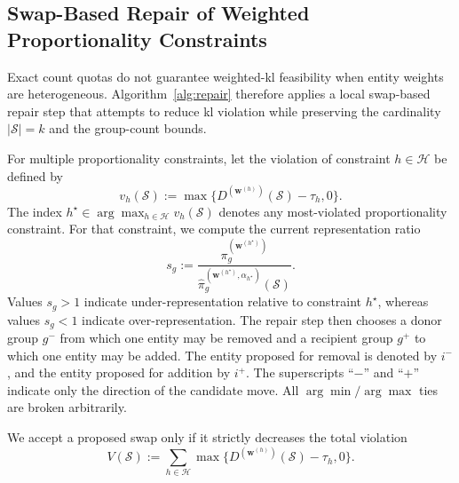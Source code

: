 \documentclass[10pt,journal]{IEEEtran}
\newcommand{\1}{\mathbf{1}}
\newcommand{\bw}{\mathbf{w}}
\newcommand{\Sel}{\mathcal{S}}
\theoremstyle{ieeethm}
\begin{document}
\subsection{Swap-Based Repair of Weighted Proportionality Constraints}
\label{subsec:algo_repair}

Exact count quotas do not guarantee weighted-\gls{kl} feasibility when entity weights are heterogeneous. Algorithm~\ref{alg:repair} therefore applies a local swap-based repair step that attempts to reduce \gls{kl} violation while preserving the cardinality $|\Sel|=k$ and the group-count bounds.

For multiple proportionality constraints, let the violation of constraint $h\in\mathcal H$ be defined by 
\begin{equation*}
 v_h(\Sel):=\max\big\{D^{(\bw^{(h)})}(\Sel)-\tau_h,0\big\}.
\end{equation*}
The index $h^\star\in\arg\max_{h\in\mathcal H} v_h(\Sel)$ denotes any most-violated proportionality constraint. For that constraint, we compute the current representation ratio
\begin{equation*}
s_g
:=
\frac{\pi_g^{(\bw^{(h^\star)})}}
{\widehat{\pi}_g^{(\bw^{(h^\star)},\alpha_{h^\star})}(\Sel)}.
\end{equation*}
Values $s_g>1$ indicate under-representation relative to constraint $h^\star$, whereas values $s_g<1$ indicate over-representation. The repair step then chooses a donor group $g^{-}$ from which one entity may be removed and a recipient group $g^{+}$ to which one entity may be added. The entity proposed for removal is denoted by $i^{-}$, and the entity proposed for addition by $i^{+}$. The superscripts “$-$” and “$+$” indicate only the direction of the candidate move. All $\arg\min/\arg\max$ ties are broken arbitrarily.

We accept a proposed swap only if it strictly decreases the total violation
\[
V(\Sel)
:=
\sum_{h\in\mathcal H}\max\big\{D^{(\bw^{(h)})}(\Sel)-\tau_h,0\big\}.
\]
\end{document}
